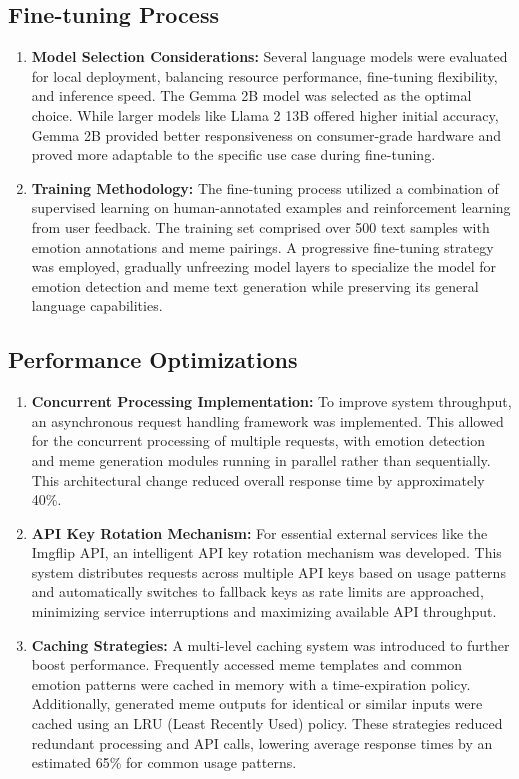 \documentclass[conference]{IEEEtran}
\begin{document}
\subsection{Fine-tuning Process}
\begin{enumerate}
    \item \textbf{Model Selection Considerations:} Several language models were evaluated for local deployment, balancing resource performance, fine-tuning flexibility, and inference speed. The Gemma 2B model was selected as the optimal choice. While larger models like Llama 2 13B offered higher initial accuracy, Gemma 2B provided better responsiveness on consumer-grade hardware and proved more adaptable to the specific use case during fine-tuning.
    \item \textbf{Training Methodology:} The fine-tuning process utilized a combination of supervised learning on human-annotated examples and reinforcement learning from user feedback. The training set comprised over 500 text samples with emotion annotations and meme pairings. A progressive fine-tuning strategy was employed, gradually unfreezing model layers to specialize the model for emotion detection and meme text generation while preserving its general language capabilities.
\end{enumerate}

\subsection{Performance Optimizations}
\begin{enumerate}
    \item \textbf{Concurrent Processing Implementation:} To improve system throughput, an asynchronous request handling framework was implemented. This allowed for the concurrent processing of multiple requests, with emotion detection and meme generation modules running in parallel rather than sequentially. This architectural change reduced overall response time by approximately 40\%.
    \item \textbf{API Key Rotation Mechanism:} For essential external services like the Imgflip API, an intelligent API key rotation mechanism was developed. This system distributes requests across multiple API keys based on usage patterns and automatically switches to fallback keys as rate limits are approached, minimizing service interruptions and maximizing available API throughput.
    \item \textbf{Caching Strategies:} A multi-level caching system was introduced to further boost performance. Frequently accessed meme templates and common emotion patterns were cached in memory with a time-expiration policy. Additionally, generated meme outputs for identical or similar inputs were cached using an LRU (Least Recently Used) policy. These strategies reduced redundant processing and API calls, lowering average response times by an estimated 65\% for common usage patterns.
\end{enumerate}
\end{document}
